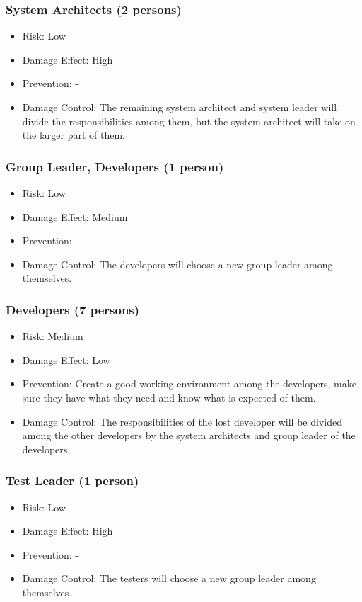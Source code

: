 \documentclass[a4paper]{article}
\begin{document}
\subsubsection{System Architects (2 persons)}
\begin{itemize}
\item Risk: Low
\item Damage Effect: High
\item Prevention: -
\item Damage Control: The remaining system architect and system leader will divide the responsibilities among them, but the system architect will take on the larger part of them.
\end{itemize}

\subsubsection{Group Leader, Developers (1 person)}
\begin{itemize}
\item Risk: Low
\item Damage Effect: Medium
\item Prevention: -
\item Damage Control: The developers will choose a new group leader among themselves.
\end{itemize}

\subsubsection{Developers (7 persons)}
\begin{itemize}
\item Risk: Medium
\item Damage Effect: Low
\item Prevention: Create a good working environment among the developers, make sure they have what they need and know what is expected of them.
\item Damage Control: The responsibilities of the lost developer will be divided among the other developers by the system architects and group leader of the developers.
\end{itemize}

\subsubsection{Test Leader (1 person)}
\begin{itemize}
\item Risk: Low
\item Damage Effect: High
\item Prevention: -
\item Damage Control: The testers will choose a new group leader among themselves.
\end{itemize}
\end{document}
